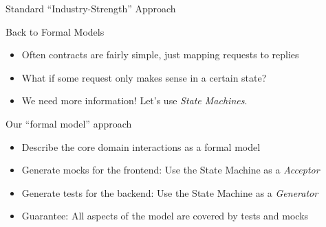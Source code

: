\begin{frame}[fragile]{Standard ``Industry-Strength'' Approach}


\end{frame}

\begin{frame}[fragile]{Back to Formal Models}
  \begin{itemize}[<+->]
  \item Often contracts are fairly simple, just mapping requests to replies
  \item What if some request only makes sense in a certain state?

  \item We need more information! Let's use \emph{State Machines}.
  \end{itemize}
\end{frame}


\begin{frame}[fragile]{Our ``formal model'' approach}

  \begin{itemize}[<+->]
  \item Describe the core domain interactions as a formal model
  \item Generate mocks for the frontend: Use the State Machine as a \emph{Acceptor}
  \item Generate tests for the backend: Use the State Machine as a \emph{Generator}
  \item Guarantee: All aspects of  the model are covered by tests and mocks
  \end{itemize}

\end{frame}


